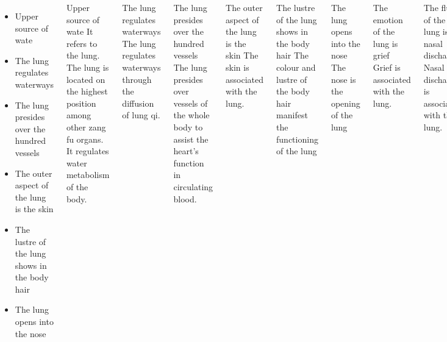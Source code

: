 \documentclass[
	11pt, %
]{beamer}
\theoremstyle{newblock}
\begin{document}
\begin{frame}
	\begin{columns}
		\begin{itemize}
			\item Upper source of wate
			\item The lung regulates waterways
			\item The lung presides over the hundred vessels
			\item The outer aspect of the lung is the skin
			\item The lustre of the lung shows in the body hair
			\item The lung opens into the nose
		\end{itemize}
		\begin{block}{Upper source of wate}
			It refers to the lung. The lung is located on the highest position among other zang fu organs. It regulates water metabolism of the body.
		\end{block}
		\begin{block}{The lung regulates waterways}
			The lung regulates waterways through the diffusion of lung qi.
		\end{block}
		\begin{block}{The lung presides over the hundred vessels}
			The lung presides over vessels of the whole body to assist the heart's function in circulating blood.
		\end{block}
		\begin{block}{The outer aspect of the lung is the skin}
			The skin is associated with the lung.
		\end{block}
		\begin{block}{The lustre of the lung shows in the body hair}
			The colour and lustre of the body hair manifest the functioning of the lung
		\end{block}
		\begin{block}{The lung opens into the nose}
			The nose is the opening of the lung
		\end{block}
		\begin{block}{The emotion of the lung is grief}
			Grief is associated with the lung.
		\end{block}
		\begin{block}{The fluid of the lung is nasal discharge}
			Nasal discharge is associated with the lung. 
		\end{block}
		\begin{block}{The Lung stores the Corporeal Soul (Po)}

\end{block}
\end{columns}
\end{frame}
\end{document}
